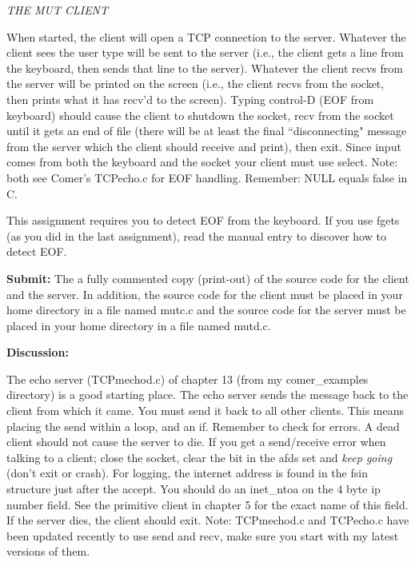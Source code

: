 {\it THE MUT CLIENT}

When started, the client will open a TCP connection to the server.
Whatever the client sees the user type will be sent to the server 
(i.e., the client gets a line from the keyboard, 
then sends that line to the server).
Whatever the client recvs from the server will be printed on the screen
(i.e., the client recvs from the socket, 
then prints what it has recv'd to the screen).
Typing control-D (EOF from keyboard) should cause the client to 
shutdown the socket, recv from the socket until it gets an end of file 
(there will be at least the final ``disconnecting" message from the
server which the client should receive and print), then exit.
Since input comes from both the keyboard and the socket your client
must use select.
Note: both see Comer's {\ltt{}TCPecho.c} for EOF handling.
Remember: {\ltt{}NULL} equals {\ltt{}false} in {\ltt{}C}.

This assignment requires you to detect EOF from the keyboard.
If you use {\ltt{}fgets} (as you did in the last assignment),
read the manual entry to discover how to detect EOF.

{\bf Submit:} The a fully commented copy (print-out) of the source code for the 
client and the server.
In addition,
the source code for the client must be placed in your home directory
in a file named {\ltt{}mutc.c} and
the source code for the server must be placed in your home directory
in a file named {\ltt{}mutd.c}.

{\bf Discussion:}

The echo server ({\ltt{}TCPmechod.c}) of chapter 13 
(from my {\ltt{}comer_examples} directory)
is a good starting place.
The echo server sends the message back to the client from which it came.
You must send it back to all other clients.
This means placing the {\ltt{}send} within a loop, and an {\ltt{}if}.
Remember to check for errors.
A dead client should not cause the server to die.
If you get a send/receive error when talking to a client;
close the socket, clear the bit in the {\ltt{}afds} set and
{\it keep going} (don't exit or crash).
For logging, the internet address is found in the {\ltt{}fsin} structure
just after the accept.
You should do an {\ltt{}inet_ntoa} on the 4 byte ip number field.
See the primitive client in chapter 5 for the exact name of this field.
If the server dies, the client should exit.
Note: {\ltt{}TCPmechod.c} and {\ltt{}TCPecho.c} have been updated
recently to use {\ltt{}send} and {\ltt{}recv}, make sure you start
with my latest versions of them.
\vfill

